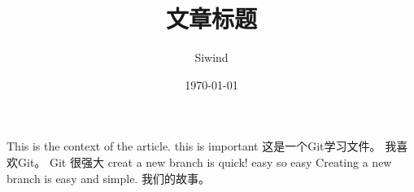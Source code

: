 \documentclass[UTF8]{ctexart}
\title{文章标题}
\author{Siwind}
\date{\today}
\begin{document}
    \maketitle
    This is the context of the article.
    this is important
    这是一个Git学习文件。
    我喜欢Git。
    Git 很强大
    creat a new branch is quick!
    easy
    so easy
    Creating a new branch is easy and simple.
    我们的故事。
    
\end{document}

